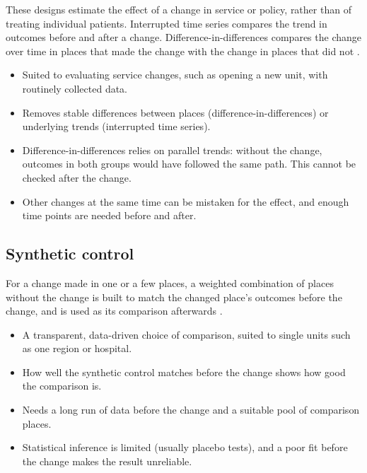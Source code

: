 These designs estimate the effect of a change in service or policy, rather than of treating individual patients. Interrupted time series compares the trend in outcomes before and after a change. Difference-in-differences compares the change over time in places that made the change with the change in places that did not \cite{bernal2017its,wing2018did}.
\begin{itemize}
\item[$+$] Suited to evaluating service changes, such as opening a new unit, with routinely collected data.
\item[$+$] Removes stable differences between places (difference-in-differences) or underlying trends (interrupted time series).
\item[$-$] Difference-in-differences relies on parallel trends: without the change, outcomes in both groups would have followed the same path. This cannot be checked after the change.
\item[$-$] Other changes at the same time can be mistaken for the effect, and enough time points are needed before and after.
\end{itemize}

\subsection{Synthetic control}

For a change made in one or a few places, a weighted combination of places without the change is built to match the changed place's outcomes before the change, and is used as its comparison afterwards \cite{abadie2010synth}.
\begin{itemize}
\item[$+$] A transparent, data-driven choice of comparison, suited to single units such as one region or hospital.
\item[$+$] How well the synthetic control matches before the change shows how good the comparison is.
\item[$-$] Needs a long run of data before the change and a suitable pool of comparison places.
\item[$-$] Statistical inference is limited (usually placebo tests), and a poor fit before the change makes the result unreliable.
\end{itemize}
